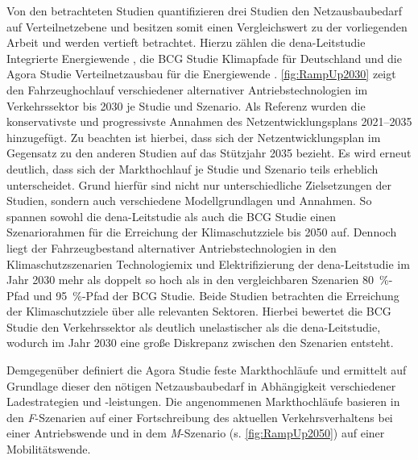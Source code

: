 

Von den betrachteten Studien quantifizieren drei Studien den Netzausbaubedarf auf Verteilnetzebene und besitzen somit einen Vergleichswert zu der vorliegenden Arbeit und werden vertieft betrachtet.
Hierzu zählen die dena-Leitstudie \glqq Integrierte Energiewende\grqq{} \cite{DEAGH2018}, die BCG Studie \glqq Klimapfade für Deutschland\grqq{} \cite{BCG2018} und die Agora Studie \glqq Verteilnetzausbau für die Energiewende\grqq{} \cite{Agora2019}.
\autoref{fig:RampUp2030} zeigt den Fahrzeughochlauf verschiedener alternativer Antriebstechnologien im Verkehrssektor bis \num{2030} je Studie und Szenario.
Als Referenz wurden die konservativste und progressivste Annahmen des Netzentwicklungsplans \numrange[range-phrase=~{--}~]{2021}{2035} \cite{BNetzA2020} hinzugefügt.
Zu beachten ist hierbei, dass sich der Netzentwicklungsplan im Gegensatz zu den anderen Studien auf das Stützjahr \num{2035} bezieht.
Es wird erneut deutlich, dass sich der Markthochlauf je Studie und Szenario teils erheblich unterscheidet.
Grund hierfür sind nicht nur unterschiedliche Zielsetzungen der Studien, sondern auch verschiedene Modellgrundlagen und Annahmen.
So spannen sowohl die dena-Leitstudie als auch die BCG Studie einen Szenariorahmen für die Erreichung der Klimaschutzziele bis \num{2050} auf.
Dennoch liegt der Fahrzeugbestand alternativer Antriebstechnologien in den Klimaschutzszenarien \glqq Technologiemix\grqq{} und \glqq Elektrifizierung\grqq{} der dena-Leitstudie im Jahr 2030 mehr als doppelt so hoch als in den vergleichbaren Szenarien \glqq \SI{80}{\percent}-Pfad\grqq{} und \glqq \SI{95}{\percent}-Pfad\grqq{} der BCG Studie.
Beide Studien betrachten die Erreichung der Klimaschutzziele über alle relevanten Sektoren.
Hierbei bewertet die BCG Studie den Verkehrssektor als deutlich unelastischer als die dena-Leitstudie, wodurch im Jahr \num{2030} eine große Diskrepanz zwischen den Szenarien entsteht.\medskip

Demgegenüber definiert die Agora Studie feste Markthochläufe und ermittelt auf Grundlage dieser den nötigen Netzausbaubedarf in Abhängigkeit verschiedener Ladestrategien und -leistungen.
Die angenommenen Markthochläufe basieren in den \textit{F}-Szenarien auf einer Fortschreibung des aktuellen Verkehrsverhaltens bei einer Antriebswende und in dem \textit{M}-Szenario (s. \autoref{fig:RampUp2050}) auf einer Mobilitätswende.



